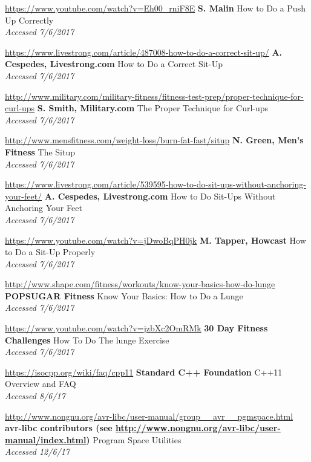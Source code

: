 \documentclass[a4paper]{article}
\begin{document}
\begin{thebibliography}{9}
\url{https://www.youtube.com/watch?v=Eh00_rniF8E}
\textbf{S. Malin}
How to Do a Push Up Correctly
\\\textit{Accessed 7/6/2017}

\url{https://www.livestrong.com/article/487008-how-to-do-a-correct-sit-up/}
\textbf{A. Cespedes, Livestrong.com}
How to Do a Correct Sit-Up
\\\textit{Accessed 7/6/2017}

\url{http://www.military.com/military-fitness/fitness-test-prep/proper-technique-for-curl-ups}
\textbf{S. Smith, Military.com}
The Proper Technique for Curl-ups
\\\textit{Accessed 7/6/2017}

\url{http://www.mensfitness.com/weight-loss/burn-fat-fast/situp}
\textbf{N. Green, Men's Fitness}
The Situp
\\\textit{Accessed 7/6/2017}

\url{https://www.livestrong.com/article/539595-how-to-do-sit-ups-without-anchoring-your-feet/}
\textbf{A. Cespedes, Livestrong.com}
How to Do Sit-Ups Without Anchoring Your Feet
\\\textit{Accessed 7/6/2017}

\url{https://www.youtube.com/watch?v=jDwoBqPH0jk}
\textbf{M. Tapper, Howcast}
How to Do a Sit-Up Properly
\\\textit{Accessed 7/6/2017}

\url{http://www.shape.com/fitness/workouts/know-your-basics-how-do-lunge}
\textbf{POPSUGAR Fitness}
Know Your Basics: How to Do a Lunge
\\\textit{Accessed 7/6/2017}

\url{https://www.youtube.com/watch?v=jzbXc2OmRMk}
\textbf{30 Day Fitness Challenges}
How To Do The lunge Exercise
\\\textit{Accessed 7/6/2017}


\url{https://isocpp.org/wiki/faq/cpp11}
\textbf{Standard C++ Foundation}
C++11 Overview and FAQ
\\\textit{Accessed 8/6/17}

\url{http://www.nongnu.org/avr-libc/user-manual/group__avr__pgmspace.html}
\textbf{avr-libc contributors (see \url{http://www.nongnu.org/avr-libc/user-manual/index.html})}
Program Space Utilities
\\\textit{Accessed 12/6/17}



\end{thebibliography}
\end{document}
